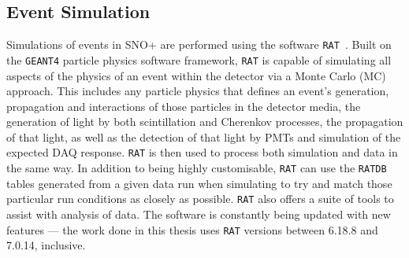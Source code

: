 \subsection{Event Simulation}\label{sec:ev_simulation}
Simulations of events in SNO+ are performed using the software \texttt{RAT}~\cite{albaneseSNOExperiment2021}. %
Built on the \texttt{GEANT4} particle physics software framework, \texttt{RAT} is capable of simulating all aspects of the physics of an event within the detector via a Monte Carlo (MC) approach. This includes any particle physics that defines an event's generation, propagation and interactions of those particles in the detector media, the generation of light by both scintillation and Cherenkov processes, the propagation of that light, as well as the detection of that light by PMTs and simulation of the expected DAQ response. \texttt{RAT} is then used to process both simulation and data in the same way. In addition to being highly customisable, \texttt{RAT} can use the \texttt{RATDB} tables generated from a given data run when simulating to try and match those particular run conditions as closely as possible. \texttt{RAT} also offers a suite of tools to assist with analysis of data. The software is constantly being updated with new features --- the work done in this thesis uses \texttt{RAT} versions between 6.18.8 and 7.0.14, inclusive.

